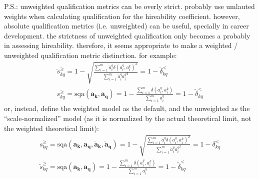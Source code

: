 \documentclass{elsarticle} %
\begin{document}
P.S.: unweighted qualification metrics can be overly strict. probably use
umlauted weights when calculating qualification for the hireability
coefficient. however, absolute qualification metrics (i.e. unweighted) can be
useful, specially in career development. the strictness of unweighted
qualification only becomes a probably in assessing hireability. therefore, it
seems appropriate to make a weighted / unweighted qualification metric
distinction. for example:
\begin{gather}
    \ddot{s}_{kq}^{\geq} =
    1 -
    \sqrt{
    \frac{
    \sum_{i=1}^{m}{
    \ddot{a}_{i}^{q} {\delta(a_{i}^{q}, a_{i}^{k})} ^ 2
    }
    }{
    \sum_{i=1}^{m}{
    \ddot{a}_{i}^{q} {a_{i}^{q}} ^ 2
    }
    }
    } =
    1 - \ddot{\delta}_{kq}^{<}
    \\
    s_{kq}^{\geq} =
    \text{sqa}(\boldsymbol{a_k}, \boldsymbol{a_q}) =
    1 -
    \frac{
    \sum_{i=1}^{m}{
    {\delta(a_{i}^{q}, a_{i}^{k})}
    }
    }{
    \sum_{i=1}^{m}{
    a_{i}^{q}
    }
    } =
    1 - \tilde{\delta}_{kq}^{<}
\end{gather}
or, instead, define the weighted model as the default, and the unweighted as the ``scale-normalized'' model (as it is normalized by the actual theoretical limit, not the weighted theoretical limit):
\begin{gather}
    s_{kq}^{\geq} =
    \text{sqa}(\boldsymbol{a_k}, \boldsymbol{a_q}, \boldsymbol{\ddot{a}_k}, \boldsymbol{\ddot{a}_q}) =
    1 -
    \sqrt{
    \frac{
    \sum_{i=1}^{m}{
    \ddot{a}_{i}^{q} {\delta(a_{i}^{q}, a_{i}^{k})} ^ 2
    }
    }{
    \sum_{i=1}^{m}{
    \ddot{a}_{i}^{q} {a_{i}^{q}} ^ 2
    }
    }
    } =
    1 - \delta_{kq}^{<}
    \\
    \tilde{s}_{kq}^{\geq} =
    \text{sqa}(\boldsymbol{a_k}, \boldsymbol{a_q}) =
    1 -
    \frac{
    \sum_{i=1}^{m}{
    {\delta(a_{i}^{q}, a_{i}^{k})}
    }
    }{
    \sum_{i=1}^{m}{
    a_{i}^{q}
    }
    } =
    1 - \tilde{\delta}_{kq}^{<}
\end{gather}
\end{document}
